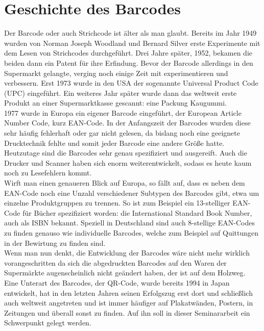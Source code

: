 \section{Geschichte des Barcodes}
Der Barcode oder auch Strichcode ist älter als man glaubt. Bereits im Jahr 1949 wurden von Norman Joseph Woodland und Bernard Silver erste Experimente mit dem Lesen von Strichcodes durchgeführt. Drei Jahre später, 1952, bekamen die beiden dann ein Patent für ihre Erfindung. 
Bevor der Barcode allerdings in den Supermarkt gelangte, verging noch einige Zeit mit experimentieren und verbessern. Erst 1973 wurde in den USA der sogenannte Universal Product Code (UPC) eingeführt. Ein weiteres Jahr später wurde dann das weltweit erste Produkt an einer Supermarktkasse gescannt: eine Packung Kaugummi.\\
1977 wurde in Europa ein eigener Barcode eingeführt, der European Article Number Code, kurz EAN-Code. 
In der Anfangszeit der Barcodes wurden diese sehr häufig fehlerhaft oder gar nicht gelesen, da bislang noch eine geeignete Drucktechnik fehlte und somit jeder Barcode eine andere Größe hatte. Heutzutage sind die Barcodes sehr genau spezifiziert und ausgereift. Auch die Drucker und Scanner haben sich enorm weiterentwickelt, sodass es heute kaum noch zu Lesefehlern kommt.\\
Wirft man einen genaueren Blick auf Europa, so fällt auf, dass es neben dem EAN-Code noch eine Unzahl verschiedener Subtypen des Barcodes gibt, etwa um einzelne Produktgruppen zu trennen. So ist zum Beispiel ein 13-stelliger EAN-Code für Bücher spezifiziert worden: die International Standard Book Number, auch als ISBN bekannt.
Speziell in Deutschland sind auch 8-stellige EAN-Codes zu finden genauso wie individuelle Barcodes, welche zum Beispiel auf Quittungen in der Bewirtung zu finden sind.\\
Wenn man nun denkt, die Entwicklung der Barcodes wäre nicht mehr wirklich vorangeschritten da sich die abgedruckten Barcodes auf den Waren der Supermärkte augenscheinlich nicht geändert haben, der ist auf dem Holzweg. \\
Eine Unterart des Barcodes, der QR-Code, wurde bereits 1994 in Japan entwickelt, hat in den letzten Jahren seinen Erfolgszug erst dort und schließlich auch weltweit angetreten und ist immer häufiger auf Plakatwänden, Postern, in Zeitungen und überall sonst zu finden\cite{Plotz2015}. Auf ihn soll in dieser Seminararbeit ein Schwerpunkt gelegt werden.

